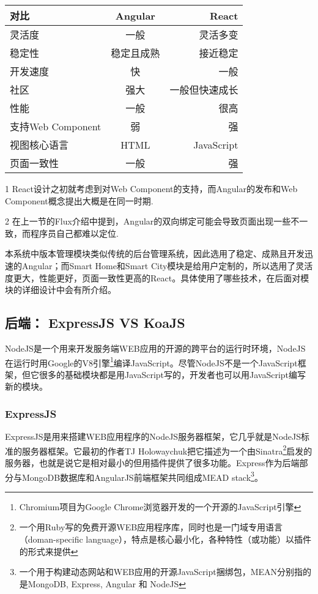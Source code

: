 \begin{table}[!htpb]
  \centering
  \begin{threeparttable}[b]
    \begin{tabular}{lcr}
      \toprule
      对比 & Angular & React \\
      \midrule
      灵活度 & 一般  & 灵活多变 \\
      稳定性 & 稳定且成熟  & 接近稳定 \\
      开发速度 & 快 & 一般\\
      社区 & 强大 & 一般但快速成长 \\
      性能 & 一般 & 很高 \\
      支持Web Component\tnote{1} & 弱 & 强 \\
      视图核心语言 & HTML & JavaScript \\
      页面一致性\tnote{2} & 一般 & 强 \\
      \bottomrule
    \end{tabular}
    \begin{tablenotes}
    \item [1] React设计之初就考虑到对Web Component的支持，而Angular的发布和Web Component概念提出大概是在同一时期.
    \item [2] 在上一节的Flux介绍中提到，Angular的双向绑定可能会导致页面出现一些不一致，而程序员自己都难以定位.
    \end{tablenotes}
  \end{threeparttable}
\end{table}

本系统中版本管理模块类似传统的后台管理系统，因此选用了稳定、成熟且开发迅速的Angular；而Smart Home和Smart City模块是给用户定制的，所以选用了灵活度更大，性能更好，页面一致性更高的React。具体使用了哪些技术，在后面对模块的详细设计中会有所介绍。

\subsection{后端： ExpressJS VS KoaJS}
NodeJS是一个用来开发服务端WEB应用的开源的跨平台的运行时环境，NodeJS在运行时用Google的V8引擎\footnote{Chromium项目为Google Chrome浏览器开发的一个开源的JavaScript引擎}编译JavaScript。尽管NodeJS不是一个JavaScript框架，但它很多的基础模块都是用JavaScript写的，开发者也可以用JavaScript编写新的模块。

\subsubsection{ExpressJS}
ExpressJS是用来搭建WEB应用程序的NodeJS服务器框架，它几乎就是NodeJS标准的服务器框架。它最初的作者TJ Holowaychuk把它描述为一个由Sinatra\footnote{一个用Ruby写的免费开源WEB应用程序库，同时也是一门域专用语言（doman-specific language），特点是核心最小化，各种特性（或功能）以插件的形式来提供}启发的服务器，也就是说它是相对最小的但用插件提供了很多功能。Express作为后端部分与MongoDB数据库和AngularJS前端框架共同组成MEAD stack\footnote{一个用于构建动态网站和WEB应用的开源JavaScript捆绑包，MEAN分别指的是MongoDB, Express, Angular 和 NodeJS}。

